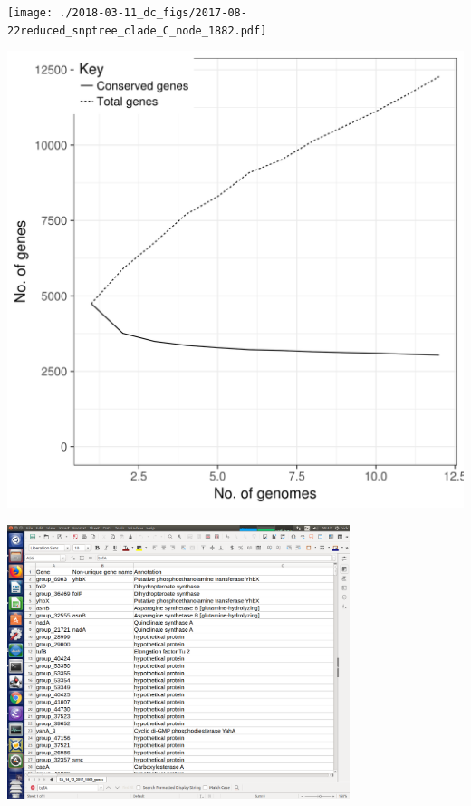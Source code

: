 \documentclass[17pt,aspectratio=169]{beamer}
\begin{document}
\begin{frame}[label={sec:orga25860d}]{}
  \texttt{[image: ./2018-03-11\_dc\_figs/2017-08-22reduced\_snptree\_clade\_C\_node\_1882.pdf]}
\end{frame}


\begin{frame}[label={sec:orga25860d}]{}
  \includegraphics[height=\textheight]{./2018-03-11_dc_figs/conserved_vs_total_genes.png}
\end{frame}

\begin{frame}[label={sec:orga25860d}]{}
  \includegraphics[width=10cm]{./2018-03-11_dc_figs/multiple.png}
\end{frame}
\end{document}
